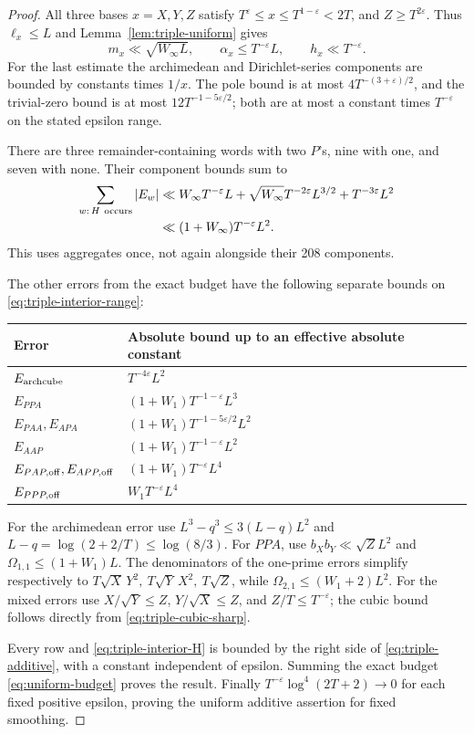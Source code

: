 \documentclass[11pt]{article}
\begin{document}
\begin{proof}
All three bases \(x=X,Y,Z\) satisfy
\(T^\varepsilon\leq x\leq T^{1-\varepsilon}<2T\), and \(Z\geq T^{2\varepsilon}\).
Thus \(\ell_x\leq L\) and Lemma~\ref{lem:triple-uniform} gives
\[
 m_x\ll\sqrt{W_\infty L},\qquad
 \alpha_x\leq T^{-\varepsilon}L,\qquad
 h_x\ll T^{-\varepsilon}.
\]
For the last estimate the archimedean and Dirichlet-series components
are bounded by constants times \(1/x\). The pole bound is at most
\(4T^{-(3+\varepsilon)/2}\), and the trivial-zero bound is at most
\(12T^{-1-5\varepsilon/2}\); both are at most a constant times
\(T^{-\varepsilon}\) on the stated epsilon range.

There are three remainder-containing words with two \(P\)'s, nine with
one, and seven with none. Their component bounds sum to
\begin{align}
 \sum_{w:\,H\ {\rm occurs}}|E_w|
 &\ll W_\infty T^{-\varepsilon}L
   +\sqrt{W_\infty}T^{-2\varepsilon}L^{3/2}
   +T^{-3\varepsilon}L^2\notag\\
 &\ll(1+W_\infty)T^{-\varepsilon}L^2.
 \label{eq:triple-interior-H}
\end{align}
This uses aggregates once, not again alongside their 208 components.

The other errors from the exact budget have the following separate
bounds on \eqref{eq:triple-interior-range}:
\begin{center}\small
\begin{tabular}{ll}
\toprule
Error & Absolute bound up to an effective absolute constant\\
\midrule
\(E_{\rm archcube}\) & \(T^{-4\varepsilon}L^2\)\\
\(E_{PPA}\) & \((1+W_1)T^{-1-\varepsilon}L^3\)\\
\(E_{PAA},E_{APA}\) & \((1+W_1)T^{-1-5\varepsilon/2}L^2\)\\
\(E_{AAP}\) & \((1+W_1)T^{-1-\varepsilon}L^2\)\\
\(E_{PAP,{\rm off}},E_{APP,{\rm off}}\) &
 \((1+W_1)T^{-\varepsilon}L^4\)\\
\(E_{PPP,{\rm off}}\) & \(W_1T^{-\varepsilon}L^4\)\\
\bottomrule
\end{tabular}
\end{center}
For the archimedean error use
\(L^3-q^3\leq3(L-q)L^2\) and
\(L-q=\log(2+2/T)\leq\log(8/3)\).
For \(PPA\), use \(b_Xb_Y\ll\sqrt Z L^2\) and
\(\Omega_{1,1}\leq(1+W_1)L\).
The denominators of the one-prime errors simplify respectively to
\(T\sqrt X\,Y^2,\ T\sqrt Y\,X^2,\ T\sqrt Z\), while
\(\Omega_{2,1}\leq(W_1+2)L^2\).
For the mixed errors use \(X/\sqrt Y\leq Z\),
\(Y/\sqrt X\leq Z\), and \(Z/T\leq T^{-\varepsilon}\);
the cubic bound follows directly from \eqref{eq:triple-cubic-sharp}.

Every row and \eqref{eq:triple-interior-H} is bounded by the right side of
\eqref{eq:triple-additive}, with a constant independent of epsilon.
Summing the exact budget \eqref{eq:uniform-budget} proves the result.
Finally \(T^{-\varepsilon}\log^4(2T+2)\to0\) for each fixed positive
epsilon, proving the uniform additive assertion for fixed smoothing.
\end{proof}
\end{document}
